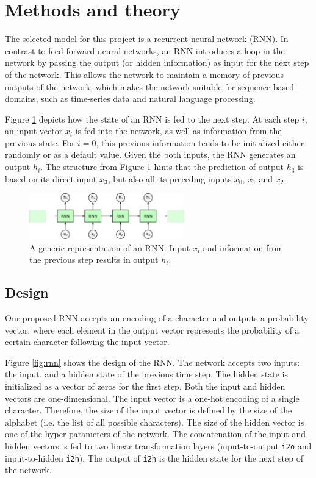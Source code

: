 \section{Methods and theory}
The selected model for this project is a recurrent neural network (RNN).
In contrast to feed forward neural networks, an RNN introduces a loop in the network by passing the output (or hidden information) as input for the next step of the network.
This allows the network to maintain a memory of previous outputs of the network, which makes the network suitable for sequence-based domains, such as time-series data and natural language processing.

Figure \ref{fig:unrolled} depicts how the state of an RNN is fed to the next step.
At each step $i$, an input vector $x_i$ is fed into the network, as well as information from the previous state.
For $i=0$, this previous information tends to be initialized either randomly or as a default value.
Given the both inputs, the RNN generates an output $h_i$.
The structure from Figure \ref{fig:unrolled} hints that the prediction of output $h_3$ is based on its direct input $x_3$, but also all its preceding inputs $x_0$, $x_1$ and $x_2$.

\begin{figure}[t]
	\label{fig:unrolled}
	\centering
	\includegraphics[width=0.6\textwidth]{figures/unrolled.eps} 
	\caption{A generic representation of an RNN. Input $x_i$ and information from the previous step results in output $h_i$.}
\end{figure}

\subsection{Design}
Our proposed RNN accepts an encoding of a character and outputs a probability vector, where each element in the output vector represents the probability of a certain character following the input vector.

Figure \ref{fig:rnn} shows the design of the RNN. The network accepts two inputs: the input, and a hidden state of the previous time step. 
The hidden state is initialized as a vector of zeros for the first step.
Both the input and hidden vectors are one-dimensional. 
The input vector is a one-hot encoding of a single character. 
Therefore, the size of the input vector is defined by the size of the alphabet (i.e. the list of all possible characters).
The size of the hidden vector is one of the hyper-parameters of the network.
The concatenation of the input and hidden vectors is fed to two linear transformation layers (input-to-output {\tt i2o} and input-to-hidden {\tt i2h}). 
The output of {\tt i2h} is the hidden state for the next step of the network.

